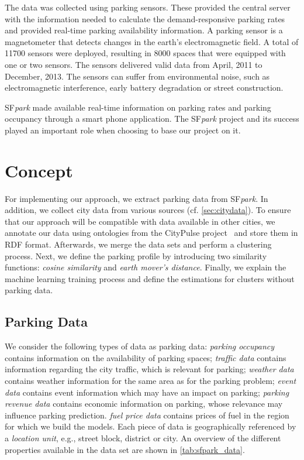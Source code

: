 The data was collected using parking sensors. These provided the central server with the information needed to calculate the demand-responsive parking rates and provided real-time parking availability information. A parking sensor is a magnetometer that detects changes in the earth's electromagnetic field. A total of 11700 sensors were deployed, resulting in 8000 spaces that were equipped with one or two sensors. The sensors delivered valid data from April, 2011 to December, 2013. The sensors can suffer from environmental noise, such as electromagnetic interference, early battery degradation or street construction. 

SF\textit{park} made available real-time information on parking rates and parking occupancy through a smart phone application. The SF\textit{park} project and its success played an important role when choosing to base our project on it.

\section{Concept}
For implementing our approach, we extract parking data from SF\textit{park}. In addition, we collect city data from various sources (cf. \cref{sec:citydata}). To ensure that our approach will be compatible with data available in other cities, we annotate our data using ontologies from the CityPulse project~\cite{city_pulse} and store them in RDF format. Afterwards, we merge the data sets and perform a clustering process. Next, we define the parking profile by introducing two similarity functions: \textit{cosine similarity} and \textit{earth mover's distance}.
Finally, we explain the machine learning training process and define the estimations for clusters without parking data.


\subsection{Parking Data}
We consider the following types of data as parking data: \textit{parking occupancy} contains information on the availability of parking spaces; \textit{traffic data} contains information regarding the city traffic, which is relevant for parking; \textit{weather data} contains weather information for the same area as for the parking problem; \textit{event data} contains event information which may have an impact on parking; \textit{parking revenue data} contains economic information on parking, whose relevance may influence parking prediction. \textit{fuel price data} contains prices of fuel in the region for which we build the models.
Each piece of data is geographically referenced by a \textit{location unit}, e.g., street block, district or city. 
An overview of the different properties available in the data set are shown in \cref{tab:sfpark_data}.

